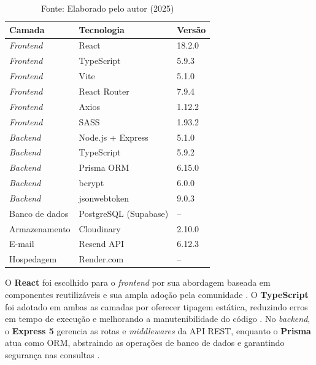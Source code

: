 \documentclass[a4paper, 12pt, oneside]{article}
\begin{document}
\begin{table}[ht]
\centering
\caption{Tecnologias utilizadas no desenvolvimento do Artlink}
\label{tab:tecnologias}
\begin{tabular}{lll}
\toprule
\textbf{Camada} & \textbf{Tecnologia} & \textbf{Versão} \\
\midrule
\textit{Frontend} & React       & 18.2.0 \\
\textit{Frontend} & TypeScript  & 5.9.3  \\
\textit{Frontend} & Vite        & 5.1.0  \\
\textit{Frontend} & React Router & 7.9.4 \\
\textit{Frontend} & Axios       & 1.12.2 \\
\textit{Frontend} & SASS        & 1.93.2 \\
\textit{Backend}  & Node.js + Express & 5.1.0 \\
\textit{Backend}  & TypeScript  & 5.9.2  \\
\textit{Backend}  & Prisma ORM  & 6.15.0 \\
\textit{Backend}  & bcrypt      & 6.0.0  \\
\textit{Backend}  & jsonwebtoken & 9.0.3 \\
Banco de dados    & PostgreSQL (Supabase) & -- \\
Armazenamento     & Cloudinary  & 2.10.0 \\
E-mail            & Resend API  & 6.12.3 \\
Hospedagem        & Render.com  & --     \\
\bottomrule
\end{tabular}
\caption*{Fonte: Elaborado pelo autor (2025)}
\end{table}

O \textbf{React} foi escolhido para o \textit{frontend} por sua abordagem baseada em componentes reutilizáveis e sua ampla adoção pela comunidade \cite{react2024}. O \textbf{TypeScript} foi adotado em ambas as camadas por oferecer tipagem estática, reduzindo erros em tempo de execução e melhorando a manutenibilidade do código \cite{typescript2024}. No \textit{backend}, o \textbf{Express 5} gerencia as rotas e \textit{middlewares} da API REST, enquanto o \textbf{Prisma} atua como ORM, abstraindo as operações de banco de dados e garantindo segurança nas consultas \cite{prisma2024}.
\end{document}
